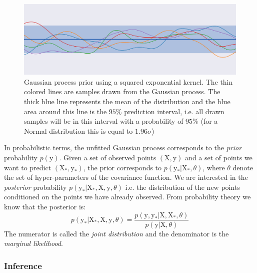 \begin{figure}[htb]
	\centering
	\includegraphics[width=\linewidth]{img_hyperopt/gp_prior.png}
	\caption[Gaussian process prior using a squared exponential kernel]{Gaussian process prior using a squared exponential kernel. The thin colored lines are samples drawn from the Gaussian process. The thick blue line represents the mean of the distribution and the blue area around this line is the $95 \%$ prediction interval, i.e. all drawn samples will be in this interval with a probability of $95 \%$ (for a Normal distribution this is equal to $1.96 \sigma$)}
	\label{fig:gp_prior}
\end{figure}

In probabilistic terms, the unfitted Gaussian process corresponds to the \textit{prior} probability $p \left( \mathrm{y} \right)$. Given a set of observed points $(\mathrm{X}, \mathrm{y})$ and a set of points we want to predict $(\mathrm{X_*}, \mathrm{y_*})$, the prior corresponds to $p\left( \mathrm{y_*} | \mathrm{X_*}, \theta \right)$, where $\theta$ denote the set of hyper-parameters of the covariance function. We are interested in the \textit{posterior} probability $p\left( \mathrm{y_*} | \mathrm{X_*}, \mathrm{X}, \mathrm{y}, \theta \right)$ i.e. the distribution of the new points conditioned on the points we have already observed. From probability theory we know that the posterior is:
\begin{equation}
    p\left( \mathrm{y_*} | \mathrm{X_*}, \mathrm{X}, \mathrm{y}, \theta \right)
    =
    \frac{p\left( \mathrm{y}, \mathrm{y_*} | \mathrm{X}, \mathrm{X_*}, \theta \right)}{p\left( \mathrm{y} | \mathrm{X}, \theta \right)}
    \label{eq:posterior}
\end{equation}
The numerator is called the \textit{joint distribution} and the denominator is the \textit{marginal likelihood}. 

\subsubsection{Inference}

